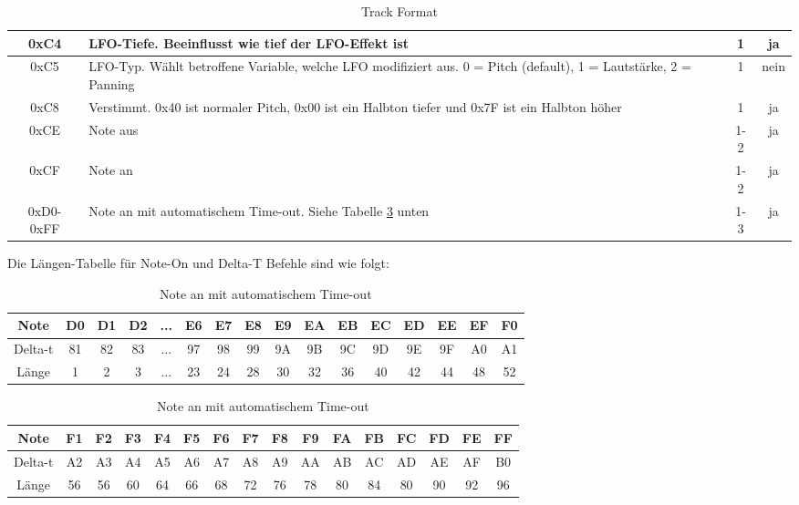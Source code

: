 \documentclass[11pt,a4paper]{scrartcl}
\begin{document}
\begin{table}[!h]
\begin{tabular}{ c | p{11cm}| c | c}
				\hline
        0xC4 & LFO-Tiefe. Beeinflusst wie tief der LFO-Effekt ist & 1 & ja\\
				\hline
        0xC5 & LFO-Typ. W\"ahlt betroffene Variable, welche LFO modifiziert aus. 0 = Pitch (default), 1 = Lautst\"arke, 2 = Panning& 1 & nein\\
				\hline
        0xC8 & Verstimmt. 0x40 ist normaler Pitch, 0x00 ist ein Halbton tiefer und 0x7F ist ein Halbton h\"oher & 1 & ja\\
				\hline
        0xCE & Note aus & 1-2 & ja\\
				\hline
        0xCF & Note an & 1-2 & ja\\
				\hline
        0xD0-0xFF & Note an mit automatischem Time-out. Siehe Tabelle \ref{table:Timeout} unten & 1-3 & ja\\
    \end{tabular}
    \caption{Track Format}
    \label{table:TrackFormat}
\end{table}
\newpage

Die L\"angen-Tabelle f\"ur Note-On und Delta-T Befehle sind wie folgt:

\begin{table}[h]
    \centering
    \begin{tabular}{ c | c | c | c | c | c | c | c | c | c | c | c | c | c | c | c }
        \textbf{Note} & \textbf{D0} & \textbf{D1} & \textbf{D2} & \textbf{...} & \textbf{E6} & \textbf{E7} & \textbf{E8} & \textbf{E9} & \textbf{EA} & \textbf{EB} & \textbf{EC} & \textbf{ED} & \textbf{EE} & \textbf{EF} & \textbf{F0}\\
        \hline
        Delta-t & 81 & 82 & 83 & ... & 97 & 98 & 99 & 9A & 9B & 9C & 9D & 9E & 9F & A0 & A1\\
        \hline
        L\"ange & 1 & 2 & 3 & ... & 23 & 24 & 28 & 30 & 32 & 36 & 40 & 42 & 44 & 48 & 52\\
    \end{tabular}
		\begin{tabular}{ c | c | c | c | c | c | c | c | c | c | c | c | c | c | c | c }
        \textbf{Note} & \textbf{F1} & \textbf{F2} & \textbf{F3} & \textbf{F4} & \textbf{F5} & \textbf{F6} & \textbf{F7} & \textbf{F8} & \textbf{F9} & \textbf{FA} & \textbf{FB} & \textbf{FC} & \textbf{FD} & \textbf{FE} & \textbf{FF}\\
        \hline
        Delta-t & A2 & A3 & A4 & A5 & A6 & A7 & A8 & A9 & AA & AB & AC & AD & AE & AF & B0\\
        \hline
        L\"ange & 56 & 56 & 60 & 64 & 66 & 68 & 72 & 76 & 78 & 80 & 84 & 80 & 90 & 92 & 96\\
    \end{tabular}
    \caption{Note an mit automatischem Time-out}
    \label{table:Timeout}
\end{table}
\end{document}
